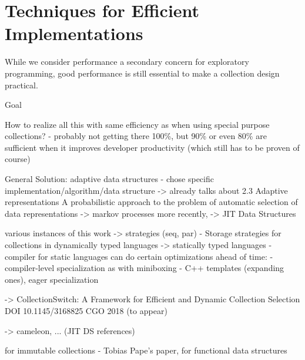 \documentclass[sigconf, 10pt]{acmart}
\begin{document}


\section{Techniques for Efficient Implementations}
\label{sec:impl-techniques}

While we consider performance a secondary concern for exploratory programming,
good performance is still essential to make a collection design practical.

\begin{note}
Goal

 How to realize all this with same efficiency as when using special purpose
 collections?
 - probably not getting there 100\%, but 90\% or even 80\% are sufficient
   when it improves developer productivity (which still has to be proven of course)


General Solution: adaptive data structures
  - chose specific implementation/algorithm/data structure
     -> \citet{PeytonJones:1996:BTC} already talks about 2.3 Adaptive representations
     A probabilistic approach to the problem of automatic selection of data representations \citep{Chuang:1996:PAP}
      -> markov processes
  more recently,   -> JIT Data Structures

various instances of this work
  -> strategies (seq, par)
   - Storage strategies for collections in dynamically typed languages \citep{Bolz:2013:SSC}
  -> statically typed languages 
    - compiler for static languages can do certain optimizations ahead of time:
      - compiler-level specialization as with miniboxing \citep{Ureche:2013:MIS}
      - C++ templates (expanding ones), eager specialization
    
   
  
  -> CollectionSwitch: A Framework for Efficient and Dynamic Collection Selection
DOI 10.1145/3168825
CGO 2018 (to appear)



  -> cameleon, ... (JIT DS references)


for immutable collections
  - Tobias Pape's paper, for functional data structures


\end{note}
\end{document}
